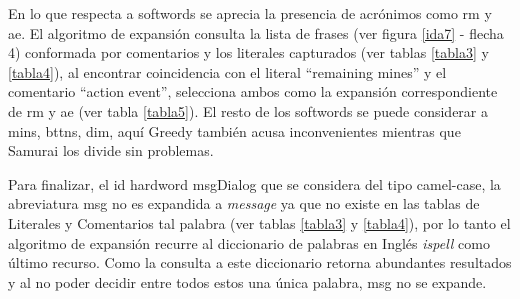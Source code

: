 \documentclass[a4paper,12pt]{report}
\begin{document}
En lo que respecta a softwords se aprecia la presencia de acrónimos como \textsf{rm} y \textsf{ae}. El algoritmo de expansión consulta la lista de frases (ver figura \ref{ida7} - flecha 4) conformada por comentarios y los literales capturados (ver tablas \ref{tabla3} y \ref{tabla4}), al encontrar coincidencia con el literal \textsf{“remaining mines”} y el comentario \textsf{“action event”}, selecciona ambos como la expansión correspondiente de \textsf{rm} y \textsf{ae} (ver tabla \ref{tabla5}).
El resto de los softwords se puede considerar a \textsf{mins}, \textsf{bttns}, \textsf{dim}, aquí Greedy también acusa inconvenientes mientras que Samurai los divide sin problemas. %

Para finalizar, el id hardword \textsf{msgDialog} que se considera del tipo camel-case, la abreviatura \textsf{msg} no es expandida a \textit{message} ya que no existe en las tablas de Literales y Comentarios tal palabra (ver tablas \ref{tabla3} y \ref{tabla4}), por lo tanto el algoritmo de expansión recurre al diccionario de palabras en Inglés \textit{ispell} como último recurso. Como la consulta a este diccionario retorna abundantes resultados y al no poder decidir entre todos estos una única palabra, \textsf{msg} no se expande.
\end{document}
